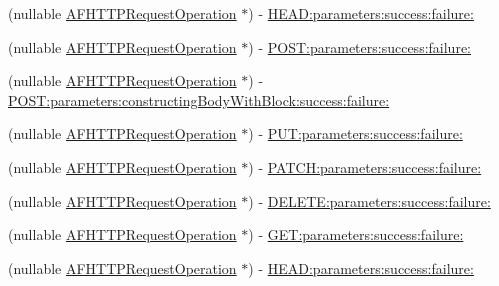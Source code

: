 \begin{Indent}
\begin{DoxyCompactItemize}
\item 
(nullable \mbox{\hyperlink{interface_a_f_h_t_t_p_request_operation}{A\+F\+H\+T\+T\+P\+Request\+Operation}} $\ast$) -\/ \mbox{\hyperlink{interface_a_f_h_t_t_p_request_operation_manager_a4174a7ffaea5282519d2d630af6ebd56}{H\+E\+A\+D\+:parameters\+:success\+:failure\+:}}
\item 
(nullable \mbox{\hyperlink{interface_a_f_h_t_t_p_request_operation}{A\+F\+H\+T\+T\+P\+Request\+Operation}} $\ast$) -\/ \mbox{\hyperlink{interface_a_f_h_t_t_p_request_operation_manager_ac8aa240cb2e04948dedabe61c29150f5}{P\+O\+S\+T\+:parameters\+:success\+:failure\+:}}
\item 
(nullable \mbox{\hyperlink{interface_a_f_h_t_t_p_request_operation}{A\+F\+H\+T\+T\+P\+Request\+Operation}} $\ast$) -\/ \mbox{\hyperlink{interface_a_f_h_t_t_p_request_operation_manager_a81aa57fcece5c05e1b6f4f7504c73703}{P\+O\+S\+T\+:parameters\+:constructing\+Body\+With\+Block\+:success\+:failure\+:}}
\item 
(nullable \mbox{\hyperlink{interface_a_f_h_t_t_p_request_operation}{A\+F\+H\+T\+T\+P\+Request\+Operation}} $\ast$) -\/ \mbox{\hyperlink{interface_a_f_h_t_t_p_request_operation_manager_aa3d3915a3f9bfb06fab881cf3a9affb3}{P\+U\+T\+:parameters\+:success\+:failure\+:}}
\item 
(nullable \mbox{\hyperlink{interface_a_f_h_t_t_p_request_operation}{A\+F\+H\+T\+T\+P\+Request\+Operation}} $\ast$) -\/ \mbox{\hyperlink{interface_a_f_h_t_t_p_request_operation_manager_a45781bd7d5d3ac10da2692964a5eb990}{P\+A\+T\+C\+H\+:parameters\+:success\+:failure\+:}}
\item 
(nullable \mbox{\hyperlink{interface_a_f_h_t_t_p_request_operation}{A\+F\+H\+T\+T\+P\+Request\+Operation}} $\ast$) -\/ \mbox{\hyperlink{interface_a_f_h_t_t_p_request_operation_manager_a5b264d221dc9185e642e11b86cfc4072}{D\+E\+L\+E\+T\+E\+:parameters\+:success\+:failure\+:}}
\item 
(nullable \mbox{\hyperlink{interface_a_f_h_t_t_p_request_operation}{A\+F\+H\+T\+T\+P\+Request\+Operation}} $\ast$) -\/ \mbox{\hyperlink{interface_a_f_h_t_t_p_request_operation_manager_a78c2fe321e78ae8bba178c3a7bcbcbf8}{G\+E\+T\+:parameters\+:success\+:failure\+:}}
\item 
(nullable \mbox{\hyperlink{interface_a_f_h_t_t_p_request_operation}{A\+F\+H\+T\+T\+P\+Request\+Operation}} $\ast$) -\/ \mbox{\hyperlink{interface_a_f_h_t_t_p_request_operation_manager_a4174a7ffaea5282519d2d630af6ebd56}{H\+E\+A\+D\+:parameters\+:success\+:failure\+:}}
\item 

\end{DoxyCompactItemize}
\end{Indent}
